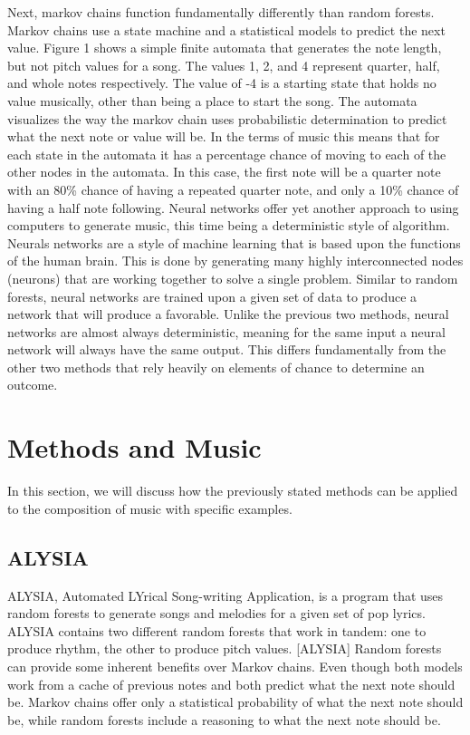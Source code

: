 \documentclass{sig-alternate}
\begin{document}
	Next, markov chains function fundamentally differently than random forests. Markov chains use a state machine and a statistical models to predict the next value. Figure 1 shows a simple finite automata that generates the note length, but not pitch values for a song. The values 1, 2, and 4 represent quarter, half, and whole notes respectively. The value of -4 is a starting state that holds no value musically, other than being a place to start the song. The automata visualizes the way the markov chain uses probabilistic determination to predict what the next note or value will be. In the terms of music this means that for each state in the automata it has a percentage chance of moving to each of the other nodes in the automata. In this case, the first note will be a quarter note with an 80\% chance of having a repeated quarter note, and only a 10\% chance of having a half note following.
	Neural networks offer yet another approach to using computers to generate music, this time being a deterministic style of algorithm. Neurals networks are a style of machine learning that is based upon the functions of the human brain. This is done by generating many highly interconnected nodes (neurons) that are working together to solve a single problem. Similar to random forests, neural networks are trained upon a given set of data to produce a network that will produce a favorable. Unlike the previous two methods, neural networks are almost always deterministic, meaning for the same input a neural network will always have the same output. This differs fundamentally from the other two methods that rely heavily on elements of chance to determine an outcome.
\section{Methods and Music}
	In this section, we will discuss how the previously stated methods can be applied to the composition of music with specific examples.
\subsection{ALYSIA}
\label{sec:ALYSIA}
	ALYSIA, Automated LYrical Song-writing Application, is a program that uses random forests to generate songs and melodies for a given set of pop lyrics. ALYSIA contains two different random forests that work in tandem: one to produce rhythm, the other to produce pitch values. [ALYSIA] Random forests can provide some inherent benefits over Markov chains. Even though both models work from a cache of previous notes and both predict what the next note should be. Markov chains offer only a statistical probability of what the next note should be, while random forests include a reasoning to what the next note should be.
	
\end{document}
